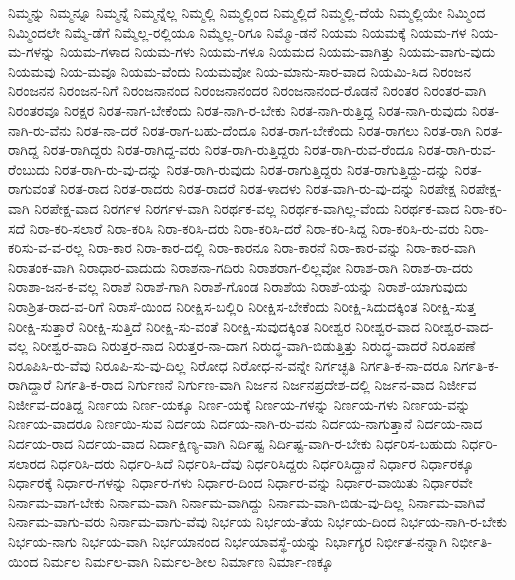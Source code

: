 {ನಿಮ್ಮನ್ನು
ನಿಮ್ಮನ್ನೂ
ನಿಮ್ಮನ್ನೆ
ನಿಮ್ಮನ್ನೆಲ್ಲ
ನಿಮ್ಮಲ್ಲಿ
ನಿಮ್ಮಲ್ಲಿಂದ
ನಿಮ್ಮಲ್ಲಿದೆ
ನಿಮ್ಮಲ್ಲಿ-ದೆಯೆ
ನಿಮ್ಮಲ್ಲಿಯೇ
ನಿಮ್ಮಿಂದ
ನಿಮ್ಮಿಂದಲೇ
ನಿಮ್ಮೆ-ಡೆಗೆ
ನಿಮ್ಮೆಲ್ಲ-ರಲ್ಲಿಯೂ
ನಿಮ್ಮೆಲ್ಲ-ರಿಗೂ
ನಿಮ್ಮೊ-ಡನೆ
ನಿಯಮ
ನಿಯಮಕ್ಕೆ
ನಿಯಮ-ಗಳ
ನಿಯ-ಮ-ಗಳನ್ನು
ನಿಯಮ-ಗಳಾದ
ನಿಯಮ-ಗಳು
ನಿಯಮ-ಗಳೂ
ನಿಯಮದ
ನಿಯಮ-ವಾಗಿತ್ತು
ನಿಯಮ-ವಾಗು-ವುದು
ನಿಯಮವು
ನಿಯ-ಮವೂ
ನಿಯಮ-ವೆಂದು
ನಿಯಮವೋ
ನಿಯ-ಮಾನು-ಸಾರ-ವಾದ
ನಿಯಮಿ-ಸಿದ
ನಿರಂಜನ
ನಿರಂಜನನ
ನಿರಂಜನ-ನಿಗೆ
ನಿರಂಜನಾನಂದ
ನಿರಂಜನಾನಂದರ
ನಿರಂಜನಾನಂದ-ರೊಡನೆ
ನಿರಂತರ
ನಿರಂತರ-ವಾಗಿ
ನಿರಂತರವೂ
ನಿರಕ್ಷರ
ನಿರತ-ನಾಗ-ಬೇಕೆಂದು
ನಿರತ-ನಾಗಿ-ರ-ಬೇಕು
ನಿರತ-ನಾಗಿ-ರುತ್ತಿದ್ದ
ನಿರತ-ನಾಗಿ-ರುವುದು
ನಿರತ-ನಾಗಿ-ರು-ವೆನು
ನಿರತ-ನಾ-ದರೆ
ನಿರತ-ರಾಗ-ಬಹು-ದೆಂದೂ
ನಿರತ-ರಾಗ-ಬೇಕೆಂದು
ನಿರತ-ರಾಗಲು
ನಿರತ-ರಾಗಿ
ನಿರತ-ರಾಗಿದ್ದ
ನಿರತ-ರಾಗಿದ್ದರು
ನಿರತ-ರಾಗಿದ್ದ-ವರು
ನಿರತ-ರಾಗಿ-ರುತ್ತಿದ್ದರು
ನಿರತ-ರಾಗಿ-ರುವ-ರೆಂದೂ
ನಿರತ-ರಾಗಿ-ರುವ-ರೆಂಬುದು
ನಿರತ-ರಾಗಿ-ರು-ವು-ದನ್ನು
ನಿರತ-ರಾಗಿ-ರುವುದು
ನಿರತ-ರಾಗುತ್ತಿದ್ದರು
ನಿರತ-ರಾಗುತ್ತಿದ್ದು-ದನ್ನು
ನಿರತ-ರಾಗುವಂತೆ
ನಿರತ-ರಾದ
ನಿರತ-ರಾದರು
ನಿರತ-ರಾದರೆ
ನಿರತ-ಳಾದಳು
ನಿರತ-ವಾಗಿ-ರು-ವು-ದನ್ನು
ನಿರಪೇಕ್ಷ
ನಿರಪೇಕ್ಷ-ವಾಗಿ
ನಿರಪೇಕ್ಷ-ವಾದ
ನಿರರ್ಗಳ
ನಿರರ್ಗಳ-ವಾಗಿ
ನಿರರ್ಥಕ-ವಲ್ಲ
ನಿರರ್ಥಕ-ವಾಗಿಲ್ಲ-ವೆಂದು
ನಿರರ್ಥಕ-ವಾದ
ನಿರಾ-ಕರಿ-ಸದೆ
ನಿರಾ-ಕರಿ-ಸಲಾರೆ
ನಿರಾ-ಕರಿಸಿ
ನಿರಾ-ಕರಿಸಿ-ದರು
ನಿರಾ-ಕರಿಸಿ-ದರೆ
ನಿರಾ-ಕರಿ-ಸಿದ್ದ
ನಿರಾ-ಕರಿಸಿ-ರು-ವರು
ನಿರಾ-ಕರಿಸು-ವ-ವ-ರಲ್ಲ
ನಿರಾ-ಕಾರ
ನಿರಾ-ಕಾರ-ದಲ್ಲಿ
ನಿರಾ-ಕಾರನೂ
ನಿರಾ-ಕಾರನೆ
ನಿರಾ-ಕಾರ-ವನ್ನು
ನಿರಾ-ಕಾರ-ವಾಗಿ
ನಿರಾತಂಕ-ವಾಗಿ
ನಿರಾಧಾರ-ವಾದುದು
ನಿರಾಶನಾ-ಗದಿರು
ನಿರಾಶರಾಗ-ಲಿಲ್ಲವೋ
ನಿರಾಶ-ರಾಗಿ
ನಿರಾಶ-ರಾ-ದರು
ನಿರಾಶಾ-ಜನ-ಕ-ವಲ್ಲ
ನಿರಾಶೆ
ನಿರಾಶೆ-ಗಾಗಿ
ನಿರಾಶೆ-ಗೊಂಡ
ನಿರಾಶೆಯ
ನಿರಾಶೆ-ಯನ್ನು
ನಿರಾಶೆ-ಯಾಗುವುದು
ನಿರಾಶ್ರಿತ-ರಾದ-ವ-ರಿಗೆ
ನಿರಾಸೆ-ಯಿಂದ
ನಿರೀಕ್ಷಿಸ-ಬಲ್ಲಿರಿ
ನಿರೀಕ್ಷಿಸ-ಬೇಕೆಂದು
ನಿರೀಕ್ಷಿ-ಸಿದುದಕ್ಕಿಂತ
ನಿರೀಕ್ಷಿ-ಸುತ್ತ
ನಿರೀಕ್ಷಿ-ಸುತ್ತಾರೆ
ನಿರೀಕ್ಷಿ-ಸುತ್ತಿದೆ
ನಿರೀಕ್ಷಿ-ಸು-ವಂತೆ
ನಿರೀಕ್ಷಿ-ಸುವುದಕ್ಕಿಂತ
ನಿರೀಶ್ವರ
ನಿರೀಶ್ವರ-ವಾದ
ನಿರೀಶ್ವರ-ವಾದ-ವಲ್ಲ
ನಿರೀಶ್ವರ-ವಾದಿ
ನಿರುತ್ತರ-ನಾದ
ನಿರುತ್ತರ-ನಾ-ದಾಗ
ನಿರುದ್ಧ-ವಾಗಿ-ಬಿಡುತ್ತಿತ್ತು
ನಿರುದ್ಧ-ವಾದರೆ
ನಿರೂಪಣೆ
ನಿರೂಪಿಸಿ-ರು-ವೆವು
ನಿರೂಪಿ-ಸು-ವು-ದಿಲ್ಲ
ನಿರೋಧ
ನಿರೋಧ-ನ-ವನ್ನೇ
ನಿರ್ಗಚ್ಛತಿ
ನಿರ್ಗತಿ-ಕ-ನಾ-ದರೂ
ನಿರ್ಗತಿ-ಕ-ರಾಗಿದ್ದಾರೆ
ನಿರ್ಗತಿ-ಕ-ರಾದ
ನಿರ್ಗುಣನೆ
ನಿರ್ಗುಣ-ವಾಗಿ
ನಿರ್ಜನ
ನಿರ್ಜನಪ್ರದೇಶ-ದಲ್ಲಿ
ನಿರ್ಜನ-ವಾದ
ನಿರ್ಜೀವ
ನಿರ್ಜೀವ-ದಂತಿದ್ದ
ನಿರ್ಣಯ
ನಿರ್ಣ-ಯಕ್ಕೂ
ನಿರ್ಣ-ಯಕ್ಕೆ
ನಿರ್ಣಯ-ಗಳನ್ನು
ನಿರ್ಣಯ-ಗಳು
ನಿರ್ಣಯ-ವನ್ನು
ನಿರ್ಣಯ-ವಾದರೂ
ನಿರ್ಣಯಿ-ಸುವ
ನಿರ್ದಯ
ನಿರ್ದಯ-ನಾಗಿ-ರು-ವನು
ನಿರ್ದಯ-ನಾಗುತ್ತಾನೆ
ನಿರ್ದಯ-ನಾದ
ನಿರ್ದಯ-ರಾದ
ನಿರ್ದಯ-ವಾದ
ನಿರ್ದಾಕ್ಷಿಣ್ಯ-ವಾಗಿ
ನಿರ್ದಿಷ್ಟ
ನಿರ್ದಿಷ್ಟ-ವಾಗಿ-ರ-ಬೇಕು
ನಿರ್ಧರಿಸ-ಬಹುದು
ನಿರ್ಧರಿ-ಸಲಾರದ
ನಿರ್ಧರಿಸಿ-ದರು
ನಿರ್ಧರಿ-ಸಿದೆ
ನಿರ್ಧರಿಸಿ-ದೆವು
ನಿರ್ಧರಿಸಿದ್ದರು
ನಿರ್ಧರಿಸಿದ್ದಾನೆ
ನಿರ್ಧಾರ
ನಿರ್ಧಾರಕ್ಕೂ
ನಿರ್ಧಾರಕ್ಕೆ
ನಿರ್ಧಾರ-ಗಳನ್ನು
ನಿರ್ಧಾರ-ಗಳು
ನಿರ್ಧಾರ-ದಿಂದ
ನಿರ್ಧಾರ-ವನ್ನು
ನಿರ್ಧಾರ-ವಾಯಿತು
ನಿರ್ಧಾರವೇ
ನಿರ್ನಾಮ-ವಾಗ-ಬೇಕು
ನಿರ್ನಾಮ-ವಾಗಿ
ನಿರ್ನಾಮ-ವಾಗಿದ್ದು
ನಿರ್ನಾಮ-ವಾಗಿ-ಬಿಡು-ವು-ದಿಲ್ಲ
ನಿರ್ನಾಮ-ವಾಗಿವೆ
ನಿರ್ನಾಮ-ವಾಗು-ವರು
ನಿರ್ನಾಮ-ವಾಗು-ವೆವು
ನಿರ್ಭಯ
ನಿರ್ಭಯ-ತೆಯ
ನಿರ್ಭಯ-ದಿಂದ
ನಿರ್ಭಯ-ನಾಗಿ-ರ-ಬೇಕು
ನಿರ್ಭಯ-ನಾಗು
ನಿರ್ಭಯ-ವಾಗಿ
ನಿರ್ಭಯಾನಂದ
ನಿರ್ಭಯಾವಸ್ಥೆ-ಯನ್ನು
ನಿರ್ಭಾಗ್ಯರ
ನಿರ್ಭೀತ-ನನ್ನಾಗಿ
ನಿರ್ಭೀತಿ-ಯಿಂದ
ನಿರ್ಮಲ
ನಿರ್ಮಲ-ವಾಗಿ
ನಿರ್ಮಲ-ಶೀಲ
ನಿರ್ಮಾಣ
ನಿರ್ಮಾ-ಣಕ್ಕೂ
}
